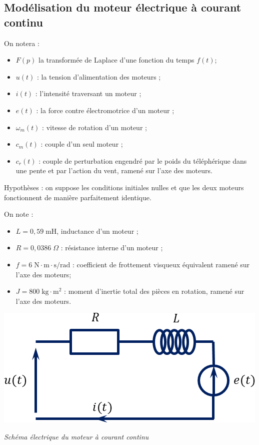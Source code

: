 \documentclass[10pt]{article}
\begin{document}
\subsection*{Modélisation du moteur électrique à courant continu}
On notera :
\begin{itemize}
\item $F(p)$ la transformée de Laplace d’une fonction du temps $f(t)$;
\item $u(t)$ : la tension d’alimentation des moteurs ;
\item $i(t)$ : l’intensité traversant un moteur ;
\item $e(t)$ : la force contre électromotrice d’un moteur ;
\item $\omega_m (t)$ : vitesse de rotation d’un moteur ;
\item $c_m (t)$ : couple d’un seul moteur ;
\item $c_r (t)$ : couple de perturbation engendré par le poids du téléphérique dans une pente et par l’action du vent, ramené sur l’axe des moteurs.	 
\end{itemize}


Hypothèses : on suppose les conditions initiales nulles et que les deux moteurs fonctionnent de manière parfaitement identique. 


On note : 
\begin{minipage}[c]{.49\linewidth}
\begin{itemize}
\item $L=0,59 \; \text{mH}$, inductance d’un moteur ;
\item $R=0,0386 \; \Omega$ : résistance interne d'un moteur ;
\item $f=6 \; \text{N}\cdot \text{m}\cdot \text{s/rad}$ : coefficient de frottement visqueux équivalent ramené sur l’axe des moteurs;
\item $J=800 \; \text{kg}\cdot \text{m}^2$ : moment d’inertie total des pièces en rotation, ramené sur l’axe des moteurs.
\end{itemize}
\end{minipage}\hfill
\begin{minipage}[c]{.49\linewidth}
\begin{center}
\includegraphics[width=.8\textwidth]{images/SchemaElectrique}

\textit{Schéma électrique du moteur à courant continu}

\end{center}
\end{minipage}
\end{document}
